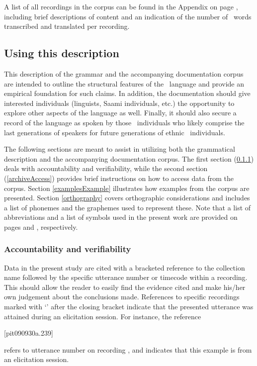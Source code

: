  A list of all recordings in the corpus can be found in the Appendix on page \pageref{inventory}, including brief descriptions of content and an indication of the number of \PS\ words transcribed and translated per recording. 




\subsection{Using this description}\label{usingThis}  
This description of the grammar and the accompanying documentation corpus are intended to outline the structural features of the \PS\ language and provide an empirical foundation for such claims. In addition, the documentation should give interested individuals (linguists, Saami individuals, etc.) the opportunity to explore other aspects of the language as well. Finally, it should also secure a record of the language as spoken by those \PS\ individuals who likely comprise the last generations of speakers for future generations of ethnic \PS\ individuals. 

The following sections are meant to assist in utilizing both the grammatical description and the accompanying documentation corpus. 
The first section (\ref{accountabilityEtc}) deals with accountability and verifiability, while the second section (\ref{archiveAccess}) provides brief instructions on how to access data from the corpus. 
Section \ref{examplesExample} illustrates how examples from the corpus are presented. %
Section \ref{orthography} covers orthographic considerations and includes a list of phonemes and the graphemes used to represent these. 
Note that a list of abbreviations and a list of symbols used in the present work are provided on pages \pageref{abbreviations} and \pageref{symbolList}, respectively. 


\subsubsection{Accountability and verifiability}\label{accountabilityEtc}
Data in the present study are cited with a bracketed reference to the collection name followed by the specific utterance number or timecode within a recording. 
This should allow the reader to easily find the evidence cited and make his/her own judgement about the conclusions made. References to specific recordings marked with ‘’ after the closing bracket indicate that the presented utterance was attained during an elicitation session. 
For instance, the reference 
\begin{center}\small[pit090930a.239]\end{center}
refers to utterance number  on recording , and indicates that this example is from an elicitation session. %

